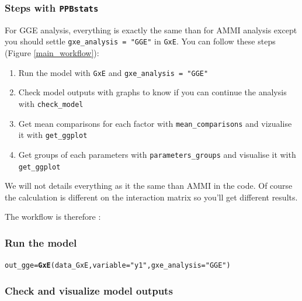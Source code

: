 \documentclass{book}\usepackage[]{graphicx}\usepackage[]{color}
\makeatletter
\newcommand{\hlstr}[1]{\textcolor[rgb]{0.192,0.494,0.8}{#1}}%
\newcommand{\hlstd}[1]{\textcolor[rgb]{0.345,0.345,0.345}{#1}}%
\newcommand{\hlkwb}[1]{\textcolor[rgb]{0.69,0.353,0.396}{#1}}%
\newcommand{\hlkwc}[1]{\textcolor[rgb]{0.333,0.667,0.333}{#1}}%
\newcommand{\hlkwd}[1]{\textcolor[rgb]{0.737,0.353,0.396}{\textbf{#1}}}%
\newenvironment{kframe}{%
 \def\at@end@of@kframe{}%
 \ifinner\ifhmode%
  \def\at@end@of@kframe{\end{minipage}}%
  \begin{minipage}{\columnwidth}%
 \fi\fi%
 \def\FrameCommand##1{\hskip\@totalleftmargin \hskip-\fboxsep
 \colorbox{shadecolor}{##1}\hskip-\fboxsep
     \hskip-\linewidth \hskip-\@totalleftmargin \hskip\columnwidth}%
 \MakeFramed {\advance\hsize-\width
   \@totalleftmargin\z@ \linewidth\hsize
   \@setminipage}}%
 {\par\unskip\endMakeFramed%
 \at@end@of@kframe}
\newenvironment{knitrout}{}{} %
\newcommand{\pack}{\texttt{PPBstats}}
\makeatother
\begin{document}
\subsubsection{Steps with \pack}


For GGE analysis, everything is exactly the same than for AMMI analysis except you should settle \texttt{gxe\_analysis = "GGE"} in \texttt{GxE}.
You can follow these steps (Figure \ref{main_workflow}):

\begin{enumerate}
\item Run the model with \texttt{GxE} and \texttt{gxe\_analysis = "GGE"}
\item Check model outputs with graphs to know if you can continue the analysis with \texttt{check\_model}
\item Get mean comparisons for each factor with \texttt{mean\_comparisons} and vizualise it with \texttt{get\_ggplot}
\item Get groups of each parameters with \texttt{parameters\_groups} and visualise it with \texttt{get\_ggplot}
\end{enumerate}

We will not details everything as it the same than AMMI in the code.
Of course the calculation is different on the interaction matrix so you'll get different results.

The workflow is therefore :

\subsubsection{Run the model}
\begin{knitrout}
\color{fgcolor}\begin{kframe}
\begin{alltt}
\hlstd{out_gge} \hlkwb{=} \hlkwd{GxE}\hlstd{(data_GxE,} \hlkwc{variable} \hlstd{=} \hlstr{"y1"}\hlstd{,} \hlkwc{gxe_analysis} \hlstd{=} \hlstr{"GGE"}\hlstd{)}
\end{alltt}


{\ttfamily\noindent\itshape\color{messagecolor}{\#\# GGE model done for y1}}\end{kframe}
\end{knitrout}

\subsubsection{Check and visualize model outputs}
\end{document}
